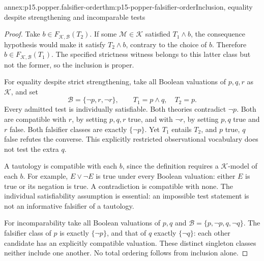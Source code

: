 \begin{annexitem}{annex:p15.popper.falsifier-order}{thm:p15-popper-falsifier-order}{Inclusion, equality despite strengthening and incomparable tests}
\begin{proof}
Take \(b\in F_{\mathcal K,\mathcal B}(T_2)\).
If some \(\mathcal M\in\mathcal K\) satisfied \(T_1\land b\),
the consequence hypothesis would make it satisfy \(T_2\land b\),
contrary to the choice of \(b\).
Therefore \(b\in F_{\mathcal K,\mathcal B}(T_1)\).
The specified strictness witness belongs to this latter class
but not the former, so the inclusion is proper.

For equality despite strict strengthening, take all Boolean
valuations of \(p,q,r\) as \(\mathcal K\), and set
\[
\mathcal B=\{\neg p,r,\neg r\},\qquad
T_1=p\land q,\quad T_2=p.
\]
Every admitted test is individually satisfiable.
Both theories contradict \(\neg p\).
Both are compatible with \(r\), by setting \(p,q,r\) true,
and with \(\neg r\), by setting \(p,q\) true and \(r\) false.
Both falsifier classes are exactly \(\{\neg p\}\).
Yet \(T_1\) entails \(T_2\), and \(p\) true, \(q\) false
refutes the converse. This explicitly restricted observational
vocabulary does not test the extra \(q\).

A tautology is compatible with each \(b\), since the definition
requires a \(\mathcal K\)-model of each \(b\).
For example, \(E\lor\neg E\) is true under every Boolean valuation:
either \(E\) is true or its negation is true.
A contradiction is compatible with none.
The individual satisfiability assumption is essential:
an impossible test statement is not an informative falsifier
of a tautology.

For incomparability take all Boolean valuations of \(p,q\) and
\(\mathcal B=\{p,\neg p,q,\neg q\}\).
The falsifier class of \(p\) is exactly \(\{\neg p\}\),
and that of \(q\) exactly \(\{\neg q\}\):
each other candidate has an explicitly compatible valuation.
These distinct singleton classes neither include one another.
No total ordering follows from inclusion alone.
\end{proof}
\end{annexitem}

